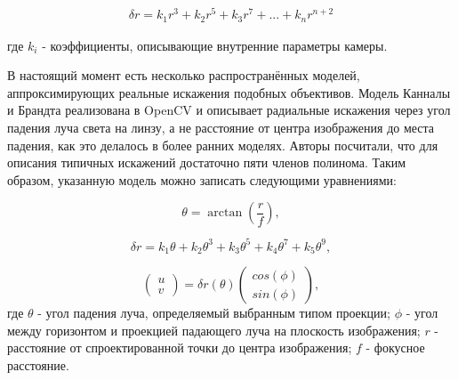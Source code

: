  \begin{equation}	%
	\begin{split}
        \delta r= k_1 r^3 + k_2 r^5 + k_3 r^7 + ... + k_n r^{n+2}
        \label{eqn:fisheye_distortion}
    \end{split}
\end{equation}

где $k_i$ - коэффициенты, описывающие внутренние параметры камеры. 

В настоящий момент есть несколько распространённых моделей, аппроксимирующих реальные искажения подобных объективов. Модель Канналы и 
Брандта \cite{opencv_model} реализована в OpenCV и описывает радиальные искажения через угол падения луча света на линзу, а не расстояние  
от центра изображения до места падения, как это делалось в более ранних моделях. Авторы посчитали, что для описания типичных искажений достаточно 
пяти членов полинома. Таким образом, указанную модель можно записать следующими уравнениями:

\begin{equation}	
        \theta = \arctan(\frac{r}{f}),
        \label{eqn:kannala_theta}
\end{equation}

\begin{equation}	
    \delta r = k_1\theta + k_2\theta^3 + k_3\theta^5 + k_4\theta^7 + k_5\theta^9,
    \label{eqn:kannala_r}
\end{equation}

\begin{equation}	
    \begin{pmatrix}u\\v\end{pmatrix} = \delta r(\theta)\begin{pmatrix}cos(\phi)\\sin(\phi)\end{pmatrix},
    \label{eqn:kannala_uv}
\end{equation}
где $\theta$ - угол падения луча, определяемый выбранным типом проекции; $\phi$ - угол между горизонтом 
и проекцией падающего луча на плоскость изображения; $r$ - расстояние от спроектированной точки до центра
изображения; $f$ - фокусное расстояние.

